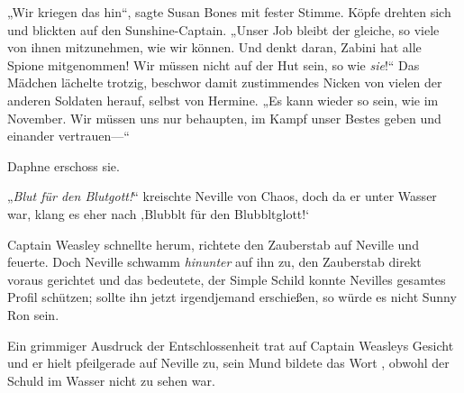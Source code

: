 „Wir kriegen das hin“, sagte Susan Bones mit fester Stimme. Köpfe drehten sich und blickten auf den Sunshine-Captain. „Unser Job bleibt der gleiche, so viele von ihnen mitzunehmen, wie wir können. Und denkt daran, Zabini hat alle Spione mitgenommen! Wir müssen nicht auf der Hut sein, so wie \emph{sie}!“ Das Mädchen lächelte trotzig, beschwor damit zustimmendes Nicken von vielen der anderen Soldaten herauf, selbst von Hermine. „Es kann wieder so sein, wie im November. Wir müssen uns nur behaupten, im Kampf unser Bestes geben und einander vertrauen—“

Daphne erschoss sie.

\later

„\emph{Blut für den Blutgott!}“ kreischte Neville von Chaos, doch da er unter Wasser war, klang es eher nach ‚Blubblt für den Blubbltglott!‘

Captain Weasley schnellte herum, richtete den Zauberstab auf Neville und feuerte. Doch Neville schwamm \emph{hinunter} auf ihn zu, den Zauberstab direkt voraus gerichtet und das bedeutete, der Simple Schild konnte Nevilles gesamtes Profil schützen; sollte ihn jetzt irgendjemand erschießen, so würde es nicht Sunny Ron sein.

Ein grimmiger Ausdruck der Entschlossenheit trat auf Captain Weasleys Gesicht und er hielt pfeilgerade auf Neville zu, sein Mund bildete das Wort , obwohl der Schuld im Wasser nicht zu sehen war.

